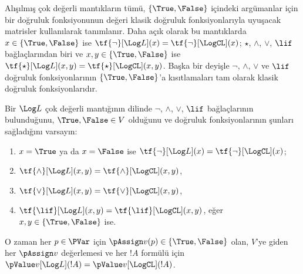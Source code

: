 



Alışılmış çok değerli mantıkların tümü, $\{\True,\False\}$ içindeki
argümanlar için bir doğruluk fonksiyonunun değeri klasik doğruluk
fonksiyonlarıyla uyuşacak matrisler kullanılarak tanımlanır. Daha açık olarak
bu mantıklarda $x\in\{\True,\False\}$ ise
$\tf{\lnot}[\Log L](x)=\tf{\lnot}[\LogCL](x)$; $\star$, $\land$, $\lor$,
$\lif$ bağlaçlarından biri ve $x,y\in\{\True,\False\}$ ise
$\tf{\star}[\Log L](x,y)=\tf{\star}[\LogCL](x,y)$. Başka bir deyişle
$\lnot$, $\land$, $\lor$ ve $\lif$ doğruluk fonksiyonlarının
$\{\True,\False\}$'a kısıtlamaları tam olarak klasik doğruluk
fonksiyonlarıdır.

\begin{prop}
  Bir $\Log L$ çok değerli mantığının dilinde $\lnot$, $\land$, $\lor$,
  $\lif$ bağlaçlarının bulunduğunu, $\True,\False\in V$ olduğunu ve doğruluk
  fonksiyonlarının şunları sağladığını varsayın:
  \begin{enumerate}
    \item{} $x=\True$ ya da $x=\False$ ise
    $\tf{\lnot}[\Log L](x)=\tf{\lnot}[\LogCL](x)$;
    \item{} $\tf{\land}[\Log L](x,y)=\tf{\land}[\LogCL](x,y)$,
    \item{} $\tf{\lor}[\Log L](x,y)=\tf{\lor}[\LogCL](x,y)$,
    \item{} $\tf{\lif}[\Log L](x,y)=\tf{\lif}[\LogCL](x,y)$,
    eğer $x,y\in\{\True,\False\}$ ise.
  \end{enumerate}
  O zaman her $p\in\PVar$ için $\pAssign v(p)\in\{\True,\False\}$ olan,
  $V$'ye giden her $\pAssign v$ değerlemesi ve her $!A$ formülü için
  $\pValue v[\Log L](!A)=\pValue v[\LogCL](!A)$.
\end{prop}


